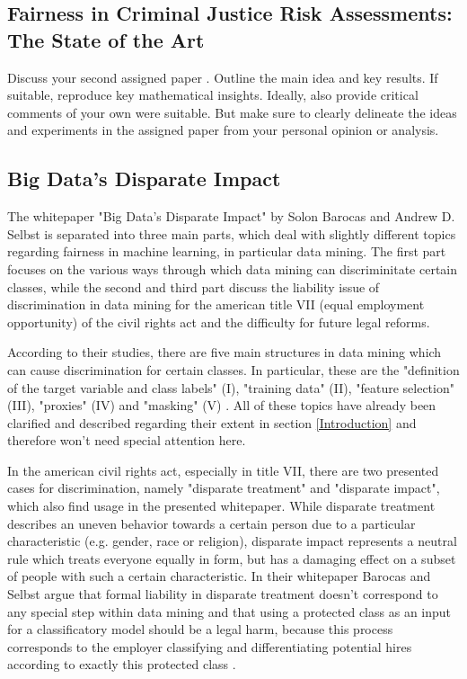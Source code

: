 \documentclass{article}
\begin{document}
\subsection{Fairness in Criminal Justice Risk Assessments: The State of the Art}

Discuss your second assigned paper \cite{Berk.2018}. Outline the main idea and key results. If suitable, reproduce key mathematical insights. Ideally, also provide critical comments of your own were suitable. But make sure to clearly delineate the ideas and experiments in the assigned paper from your personal opinion or analysis.

\subsection{Big Data’s Disparate Impact}
The whitepaper "Big Data’s Disparate Impact" \cite{Barocas.2016} by Solon Barocas and Andrew D. Selbst is separated into three main parts, which deal with slightly different topics regarding fairness in machine learning, in particular data mining. The first part focuses on the various ways through which data mining can discriminitate certain classes, while the second and third part discuss the liability issue of discrimination in data mining for the american title VII (equal employment opportunity) \cite{titleVII} of the civil rights act and the difficulty for future legal reforms.

According to their studies, there are five main structures in data mining which can cause discrimination for certain classes. In particular, these are the "definition of the target variable and class labels" (I), "training data" (II), "feature selection" (III), "proxies" (IV) and "masking" (V) \cite{Barocas.2016}. All of these topics have already been clarified and described regarding their extent in section \ref{Introduction} and therefore won't need special attention here.

In the american civil rights act, especially in title VII, there are two presented cases for discrimination, namely "disparate treatment" and "disparate impact", which also find usage in the presented whitepaper. While disparate treatment describes an uneven behavior towards a certain person due to a particular characteristic (e.g. gender, race or religion), disparate impact represents a neutral rule which treats everyone equally in form, but has a damaging effect on a subset of people with such a certain characteristic. In their whitepaper Barocas and Selbst argue that formal liability in disparate treatment doesn't correspond to any special step within data mining and that using a protected class as an input for a classificatory model should be a legal harm, because this process corresponds to the employer classifying and differentiating potential hires according to exactly this protected class \cite{Barocas.2016}.
\end{document}
